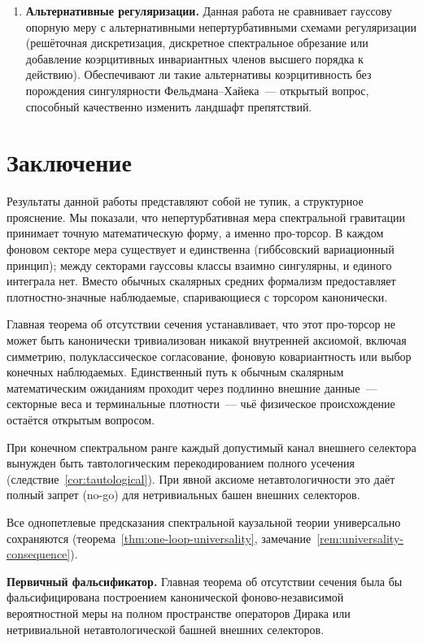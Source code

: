 \documentclass[12pt,a4paper]{article}
\theoremstyle{plain}
\theoremstyle{definition}
\theoremstyle{remark}
\begin{document}
\begin{enumerate}[leftmargin=2em]
  \item \textbf{Альтернативные регуляризации.} Данная работа не
    сравнивает гауссову опорную меру с альтернативными
    непертурбативными схемами регуляризации (решёточная
    дискретизация, дискретное спектральное обрезание или добавление
    коэрцитивных инвариантных членов высшего порядка к действию).
    Обеспечивают ли такие альтернативы коэрцитивность без
    порождения сингулярности Фельдмана--Хайека~--- открытый вопрос,
    способный качественно изменить ландшафт препятствий.
\end{enumerate}

\section{Заключение}

Результаты данной работы представляют собой не тупик, а структурное прояснение. Мы показали, что непертурбативная мера спектральной гравитации принимает точную математическую форму, а именно про-торсор. В каждом фоновом секторе мера существует и единственна (гиббсовский вариационный принцип); между секторами гауссовы классы взаимно сингулярны, и единого интеграла нет. Вместо обычных скалярных средних формализм предоставляет плотностно-значные наблюдаемые, спаривающиеся с торсором канонически.

Главная теорема об отсутствии сечения устанавливает, что этот
про-торсор не может быть канонически тривиализован никакой внутренней
аксиомой, включая симметрию, полуклассическое согласование, фоновую
ковариантность или выбор конечных наблюдаемых.  Единственный путь
к обычным скалярным математическим ожиданиям проходит через подлинно
внешние данные~--- секторные веса и терминальные плотности~--- чьё
физическое происхождение остаётся открытым вопросом.

При конечном спектральном ранге каждый допустимый канал внешнего
селектора вынужден быть тавтологическим перекодированием полного
усечения (следствие~\ref{cor:tautological}).  При явной аксиоме
нетавтологичности это даёт полный запрет (no-go) для нетривиальных
башен внешних селекторов.

Все однопетлевые предсказания спектральной каузальной теории
универсально сохраняются
(теорема~\ref{thm:one-loop-universality},
замечание~\ref{rem:universality-consequence}).

\medskip

\noindent\textbf{Первичный фальсификатор.}\quad
Главная теорема об отсутствии сечения была бы фальсифицирована
построением канонической фоново-независимой вероятностной меры на
полном пространстве операторов Дирака или нетривиальной
нетавтологической башней внешних селекторов.
\end{document}
